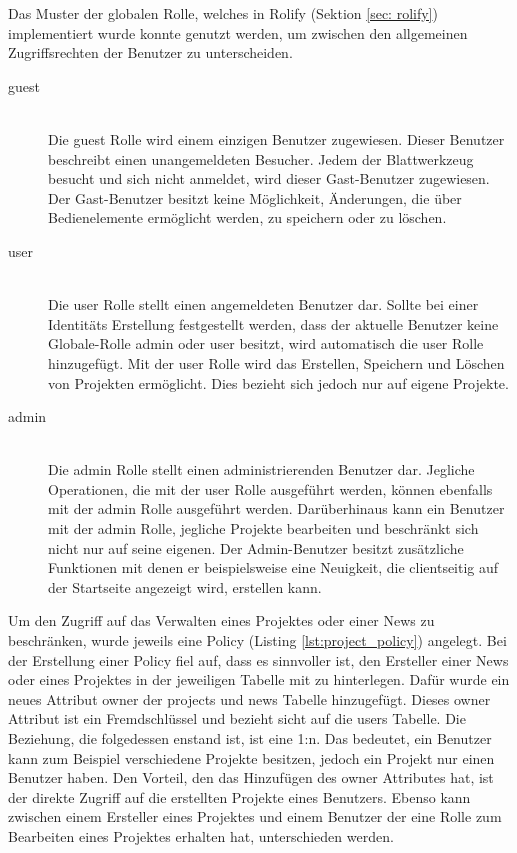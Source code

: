 Das Muster der globalen Rolle, welches in Rolify (Sektion \ref{sec: rolify}) implementiert wurde konnte genutzt werden, um zwischen den allgemeinen Zugriffsrechten der Benutzer zu unterscheiden.

\begin{description}
	\item[guest]\hfill\\
	Die guest Rolle wird einem einzigen Benutzer zugewiesen. Dieser Benutzer beschreibt einen unangemeldeten Besucher. Jedem der Blattwerkzeug besucht und sich nicht anmeldet, wird dieser Gast-Benutzer zugewiesen. Der Gast-Benutzer besitzt keine Möglichkeit, Änderungen, die über Bedienelemente ermöglicht werden, zu speichern oder zu löschen.
	\item[user]\hfill\\
	Die user Rolle stellt einen angemeldeten Benutzer dar. Sollte bei einer Identitäts Erstellung festgestellt werden, dass der aktuelle Benutzer keine Globale-Rolle admin oder user besitzt, wird automatisch die user Rolle hinzugefügt. Mit der user Rolle wird das Erstellen, Speichern und Löschen von Projekten ermöglicht. Dies bezieht sich jedoch nur auf eigene Projekte.
	\item[admin]\hfill\\
	Die admin Rolle stellt einen administrierenden Benutzer dar. Jegliche Operationen, die mit der user Rolle ausgeführt werden, können ebenfalls mit der admin Rolle ausgeführt werden. Darüberhinaus kann ein Benutzer mit der admin Rolle, jegliche Projekte bearbeiten und beschränkt sich nicht nur auf seine eigenen. Der Admin-Benutzer besitzt zusätzliche Funktionen mit denen er beispielsweise eine Neuigkeit, die clientseitig auf der Startseite angezeigt wird, erstellen kann.
\end{description}

Um den Zugriff auf das Verwalten eines Projektes oder einer News zu beschränken, wurde jeweils eine Policy (Listing \ref{lst:project_policy}) angelegt. Bei der Erstellung einer Policy fiel auf, dass es sinnvoller ist, den Ersteller einer News oder eines Projektes in der jeweiligen Tabelle mit zu hinterlegen. Dafür wurde ein neues Attribut owner der projects und news Tabelle hinzugefügt. Dieses owner Attribut ist ein Fremdschlüssel und bezieht sicht auf die users Tabelle. Die Beziehung, die folgedessen enstand ist, ist eine 1:n. Das bedeutet, ein Benutzer kann zum Beispiel verschiedene Projekte besitzen, jedoch ein Projekt nur einen Benutzer haben. Den Vorteil, den das Hinzufügen des owner Attributes hat, ist der direkte Zugriff auf die erstellten Projekte eines Benutzers. Ebenso kann zwischen einem Ersteller eines Projektes und einem Benutzer der eine Rolle zum Bearbeiten eines Projektes erhalten hat, unterschieden werden.

